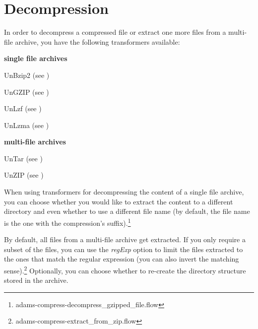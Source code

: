 \documentclass[a4paper]{book}
\begin{document}
\chapter{Decompression}
In order to decompress a compressed file or extract one more files from a
multi-file archive, you have the following transformers available:
\begin{tight_itemize}
	\item \textbf{single file archives}
	\begin{tight_itemize}
		\item UnBzip2 (see \cite{bzip2})
		\item UnGZIP (see \cite{gzip})
		\item UnLzf (see \cite{lzf})
		\item UnLzma (see \cite{lzma})
	\end{tight_itemize}
	\item \textbf{multi-file archives}
	\begin{tight_itemize}
		\item UnTar (see \cite{tar})
		\item UnZIP (see \cite{zip})
	\end{tight_itemize}
\end{tight_itemize}

When using transformers for decompressing the content of a single file archive,
you can choose whether you would like to extract the content to a different 
directory and even whether to use a different file name (by default, the file name
is the one with the compression's suffix).\footnote{adams-compress-decompress\_gzipped\_file.flow}

By default, all files from a multi-file archive get extracted. If you only 
require a subset of the files, you can use the \textit{regExp} option to
limit the files extracted to the ones that match the regular expression (you
can also invert the matching sense).\footnote{adams-compress-extract\_from\_zip.flow}
Optionally, you can choose whether to re-create the directory structure 
stored in the archive.


\end{document}
